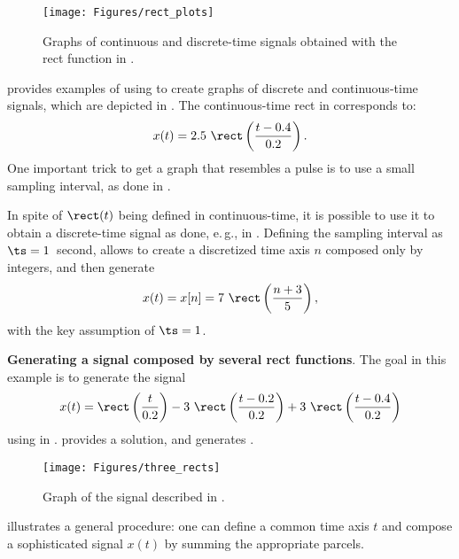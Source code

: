 
\begin{figure}
	\centering
		\texttt{[image: Figures/rect\_plots]}		
	\caption{Graphs of continuous and discrete-time signals obtained with the rect function in .\label{fig:rect_plots}}
\end{figure}

 provides examples of using  to create graphs of discrete and continuous-time signals, which are depicted in . The continuous-time rect in  corresponds to:
\[
x(t) = 2.5 \textrm{~} \rect \left( \frac{t-0.4}{0.2} \right).
\]
One important trick to get a graph that resembles a pulse is to use a small sampling interval, as done in .

In spite of $\rect(t)$ being defined in continuous-time, it is possible to use it to obtain a discrete-time signal as 
done, e.\,g., in . Defining the sampling interval as $\ts = 1$~second, allows to create a discretized
time axis $n$ composed only by integers, and then generate
\[
x(t) = x[n] = 7 \textrm{~} \rect \left( \frac{n+3}{5} \right),
\]
with the key assumption of $\ts=1$.
\eExample

\bExample \textbf{Generating a signal composed by several rect functions}.
The goal in this example is to generate the signal
\begin{equation}
x(t) = \rect \left( \frac{t}{0.2} \right) - 3 \textrm{~} \rect \left( \frac{t-0.2}{0.2} \right) + 3 \textrm{~} \rect \left( \frac{t-0.4}{0.2} \right)
\label{eq:three_rects}
\end{equation}
using  in \matlab. 
 provides a solution, and generates .


\begin{figure}
	\centering
		\texttt{[image: Figures/three\_rects]}		
	\caption{Graph of the signal described in .\label{fig:three_rects}}
\end{figure}

 illustrates a general procedure: one can define a common time axis $t$ and compose
a sophisticated signal $x(t)$ by summing the appropriate parcels.
\eExample

